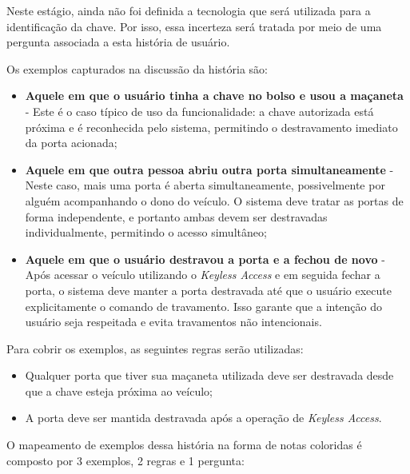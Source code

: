 Neste estágio, ainda não foi definida a tecnologia que será utilizada para a identificação da chave. Por isso, essa incerteza será tratada por meio de uma 
pergunta associada a esta história de usuário.

Os exemplos capturados na discussão da história são:

\begin{itemize}
    \item \textbf{Aquele em que o usuário tinha a chave no bolso e usou a maçaneta} - Este é o caso típico de uso da funcionalidade: a chave autorizada está próxima e é reconhecida pelo sistema, permitindo o destravamento imediato da porta acionada;
    \item \textbf{Aquele em que outra pessoa abriu outra porta simultaneamente} - Neste caso, mais uma porta é aberta simultaneamente, possivelmente por alguém acompanhando o dono do veículo. O sistema deve tratar as portas de forma independente, e portanto ambas devem ser destravadas individualmente, permitindo o acesso simultâneo;
    \item \textbf{Aquele em que o usuário destravou a porta e a fechou de novo} - Após acessar o veículo utilizando o \textit{Keyless Access} e em seguida fechar a porta, o sistema deve manter a porta destravada até que o usuário execute explicitamente o comando de travamento. Isso garante que a intenção do usuário seja respeitada e evita travamentos não intencionais.
\end{itemize}

Para cobrir os exemplos, as seguintes regras serão utilizadas:

\begin{itemize}
    \item Qualquer porta que tiver sua maçaneta utilizada deve ser destravada desde que a chave esteja próxima ao veículo;
    \item A porta deve ser mantida destravada após a operação de \textit{Keyless Access}.
\end{itemize}

O mapeamento de exemplos dessa história na forma de notas coloridas é composto por 3 exemplos, 2 regras e 1 pergunta:

